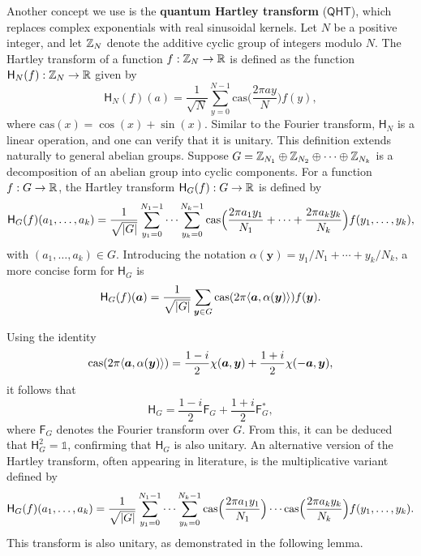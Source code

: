\documentclass[12pt]{report}
\newcommand{\cas}{\mathrm{cas}}
\newcommand{\cht}{\mathsf{H}}
\newcommand{\qht}{\mathsf{QHT}}
\newcommand{\cft}{\mathsf{F}}
\begin{document}
Another concept we use is the \textbf{quantum Hartley transform} ($\qht$), which replaces complex exponentials with real sinusoidal kernels.
Let $N$ be a positive integer, and let $\mathbb{Z}_N$ denote the additive cyclic group of integers modulo $N$. The Hartley transform of a function $f: \mathbb{Z}_N \to \mathbb{R}$ is defined as the function $\cht_N(f): \Z_N \to \R$ given by
\[
\cht_N(f)(a) = \frac{1}{\sqrt{N}} \sum_{y = 0}^{N - 1} \cas\Big(\frac{2 \pi ay}{N}\Big) f(y),
\]
where $\cas(x) = \cos(x) + \sin(x)$. Similar to the Fourier transform, $\cht_N$ is a linear operation, and one can verify that it is unitary. This definition extends naturally to general abelian groups. Suppose $G = \mathbb{Z}_{N_1} \oplus \mathbb{Z}_{N_2} \oplus \cdots \oplus \mathbb{Z}_{N_k}$ is a decomposition of an abelian group into cyclic components. For a function $f: G \to \mathbb{R}$, the Hartley transform $\cht_G(f): G \to \R$ is defined by
\begin{equation}
    \label{eq:cht-add}
    \cht_G(f)(a_1, \dots, a_k) = \frac{1}{\sqrt{\abs{G}}} \sum_{y_1 = 0}^{N_1 - 1} \cdots \sum_{y_k = 0}^{N_k - 1} \cas\Big(\frac{2 \pi a_1y_1}{N_1} + \cdots + \frac{2 \pi a_ky_k}{N_k}\Big) f(y_1, \dots, y_k),
\end{equation}
with $(a_1, \dots, a_k) \in G$. Introducing the notation $\alpha(\bm{y}) = y_1 / N_1 + \cdots + y_k / N_k$, a more concise form for $\cht_G$ is
\[
\cht_G(f)(\bm{a}) = \frac{1}{\sqrt{\abs{G}}} \sum_{\bm{y} \in G} \cas(2\pi \lrang{\bm{a}, \alpha(\bm{y})}) f(\bm{y}).
\]

Using the identity
\[
\cas(2\pi \lrang{\bm{a}, \alpha(\bm{y})}) = \frac{1 - i}{2}\chi(\bm{a}, \bm{y}) + \frac{1 + i}{2}\chi(-\bm{a}, \bm{y}),
\]
it follows that
\begin{equation}
    \label{eq:ht-ft}
    \cht_G = \frac{1 - i}{2}\cft_G + \frac{1 + i}{2}\cft_G^*,
\end{equation}
where $\cft_G$ denotes the Fourier transform over $G$. From this, it can be deduced that $\cht_G^2 = \mathds{1}$, confirming that $\cht_G$ is also unitary. An alternative version of the Hartley transform, often appearing in literature, is the multiplicative variant defined by
\begin{equation}
    \label{eq:cht-mult}
    \cht_G(f)(a_1, \dots, a_k) = \frac{1}{\sqrt{\abs{G}}} \sum_{y_1 = 0}^{N_1 - 1} \cdots \sum_{y_k = 0}^{N_k - 1} \mathrm{cas}\Big(\frac{2 \pi a_1y_1}{N_1}\Big) \cdots \cas\Big(\frac{2 \pi a_ky_k}{N_k}\Big) f(y_1, \dots, y_k).
\end{equation}
This transform is also unitary, as demonstrated in the following lemma.
\end{document}
